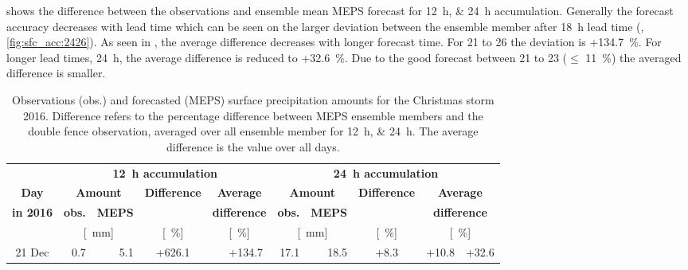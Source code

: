  shows the difference between the observations and ensemble mean MEPS forecast for \SIlist{12;24}{\hour} accumulation. Generally the forecast accuracy decreases with lead time which can be seen on the larger deviation between the ensemble member after \SI{18}{\hour} lead time (, \ref{fig:sfc_acc:2426}). As seen in , the average difference decreases with longer forecast time. For \num{21} to \SI{26}{\dec} the deviation is +\SI{134.7}{\percent}. For longer lead times, \SI{24}{\hour}, the average difference is reduced to +\SI{32.6}{\percent}. Due to the good forecast between \num{21} to \SI{23}{\dec} ($\le$ \SI{11}{\percent}) the averaged difference is smaller. 
\begin{table}[!t]
	\begin{center}
		\caption{Observations (obs.) and forecasted (MEPS) surface precipitation amounts for the Christmas storm 2016. Difference refers to the percentage difference between MEPS ensemble members and the double fence observation, averaged over all ensemble member for \SIlist{12;24}{\hour}. The average difference is the value over all days.}\label{tab:res:MEPS_err}
		\begin{tabular}{c||r|r|c|c|c||r|r|c|c|c}
			\hline \hline
			& \multicolumn{5}{c||}{\textbf{\SI{12}{\hour} accumulation}} & \multicolumn{5}{c}{\textbf{\SI{24}{\hour} accumulation}}    \\ \cline{2-11}
			\textbf{Day} & \multicolumn{2}{c|}{\textbf{Amount}} & \textbf{Difference} & \multicolumn{2}{c||}{\textbf{Average}} &  \multicolumn{2}{c|}{\textbf{Amount}} & \textbf{Difference} & \multicolumn{2}{c}{\textbf{Average}}  \\\cline{2-3} \cline{7-8}
			\textbf{in 2016} & \textbf{obs.} & \textbf{MEPS} & & \multicolumn{2}{c||}{\textbf{difference}} & \textbf{obs.} & \textbf{MEPS} & & \multicolumn{2}{c}{\textbf{difference}} \\\cline{2-11}
			& \multicolumn{2}{c|}{[\SI{}{\mm}]} & [\SI{}{\percent}] & \multicolumn{2}{c||}{ [\SI{}{\percent}]} & \multicolumn{2}{c|}{[\SI{}{\mm}]} & [\SI{}{\percent}] & \multicolumn{2}{c}{ [\SI{}{\percent}]} \\ \hline\hline
			\num{21} Dec & \num{0.7} & \num{5.1} & +\num{626.1} &  &\multirow{6}{*}{+\num{134.7}} & \num{17.1} & \num{18.5} & +\num{8.3} & \multirow{3}{*}{+\num{10.8}}& \multirow{6}{*}{+\num{32.6}}   \\\cline{1-5}\cline{7-9} 

\end{tabular}
\end{center}
\end{table}

